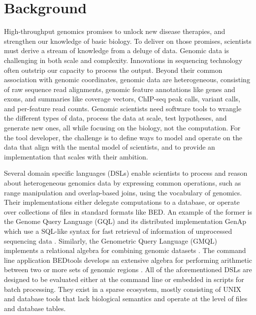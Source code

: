 \documentclass[]{article}
\begin{document}
\vskip 6.5pt


\noindent  \hypertarget{background}{%
\section{Background}\label{background}}

High-throughput genomics promises to unlock new disease therapies, and
strengthen our knowledge of basic biology. To deliver on those promises,
scientists must derive a stream of knowledge from a deluge of data.
Genomic data is challenging in both scale and complexity. Innovations in
sequencing technology often outstrip our capacity to process the output.
Beyond their common association with genomic coordinates, genomic data
are heterogeneous, consisting of raw sequence read alignments, genomic
feature annotations like genes and exons, and summaries like coverage
vectors, ChIP-seq peak calls, variant calls, and per-feature read
counts. Genomic scientists need software tools to wrangle the different
types of data, process the data at scale, test hypotheses, and generate
new ones, all while focusing on the biology, not the computation. For
the tool developer, the challenge is to define ways to model and operate
on the data that align with the mental model of scientists, and to
provide an implementation that scales with their ambition.

Several domain specific languages (DSLs) enable scientists to process
and reason about heterogeneous genomics data by expressing common
operations, such as range manipulation and overlap-based joins, using
the vocabulary of genomics. Their implementations either delegate
computations to a database, or operate over collections of files in
standard formats like BED. An example of the former is the Genome Query
Language (GQL) and its distributed implementation GenAp which use a
SQL-like syntax for fast retrieval of information of unprocessed
sequencing data \autocites{Kozanitis2014-va}{Kozanitis2016-bm}.
Similarly, the Genometric Query Language (GMQL) implements a relational
algebra for combining genomic datasets \cite{Kaitoua2017-pw}. The
command line application BEDtools develops an extensive algebra for
performing arithmetic between two or more sets of genomic regions
\cite{Quinlan2010-gc}. All of the aforementioned DSLs are designed to be
evaluated either at the command line or embedded in scripts for batch
processing. They exist in a sparse ecosystem, mostly consisting of UNIX
and database tools that lack biological semantics and operate at the
level of files and database tables.
\end{document}
